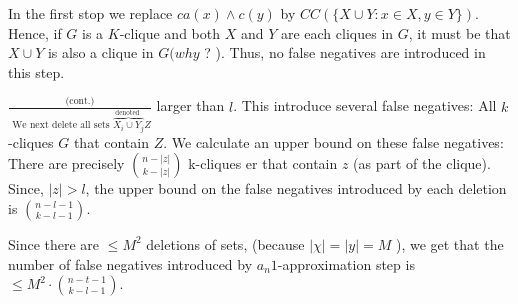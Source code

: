 In the first stop we replace $c a(x) \wedge c(y)$ by $C C(\{X \cup Y: x \in X, y \in Y\})$.
Hence, if $G$ is a $K$-clique and both $X$ and $Y$ are each cliques in $G$, it must be that $X \cup Y$ is also a clique in $G(w h y$ ? ). Thus, no false negatives are introduced in this step.


$\frac{\text { (cont.) }}{\text { We next delete all sets } \overbrace{X_i \cup Y_j}^{\text {denoted }} Z}$ larger than $l$. This introduce several false negatives:
All $k$-cliques $G$ that contain $Z$.
We calculate an upper bound on these false negatives: There are precisely $\binom{n-|z|}{k-|z|}$ k-cliques er that contain $z$ (as part of the clique). Since, $|z|>l$, the upper bound on the false negatives introduced by each deletion is $\binom{n-l-1}{k-l-1}$.

Since there are $\leqslant M^2$ deletions of sets, (because $|\chi|=|y|=M$ ), we get that the number of false negatives introduced by $a_n 1$-approximation step is $\leqslant M^2 \cdot\binom{n-t-1}{k-l-1}$.
